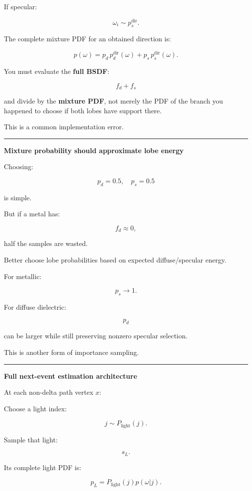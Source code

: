If specular:

\[
\omega_i\sim p_s^{\text{dir}}.
\]

The complete mixture PDF for an obtained direction is:

\[
\boxed{
p(\omega)
=
p_d\,p_d^{\text{dir}}(\omega)
+
p_s\,p_s^{\text{dir}}(\omega).
}
\]

You must evaluate the \textbf{full BSDF}:

\[
f_d+f_s
\]

and divide by the \textbf{mixture PDF}, not merely the PDF of the branch you happened to choose if both lobes have support there.

This is a common implementation error.

\begin{center}\rule{0.5\linewidth}{0.5pt}\end{center}

\textbf{Mixture probability should approximate lobe energy}

Choosing:

\[
p_d=0.5,
\quad
p_s=0.5
\]

is simple.

But if a metal has:

\[
f_d\approx0,
\]

half the samples are wasted.

Better choose lobe probabilities based on expected diffuse/specular energy.

For metallic:

\[
p_s\rightarrow1.
\]

For diffuse dielectric:

\[
p_d
\]

can be larger while still preserving nonzero specular selection.

This is another form of importance sampling.

\begin{center}\rule{0.5\linewidth}{0.5pt}\end{center}

\textbf{Full next-event estimation architecture}

At each non-delta path vertex \(x\):

Choose a light index:

\[
j\sim P_{\text{light}}(j).
\]

Sample that light:

\[
s_L.
\]

Its complete light PDF is:

\[
\boxed{
p_L
=
P_{\text{light}}(j)
p(\omega|j).
}
\]

